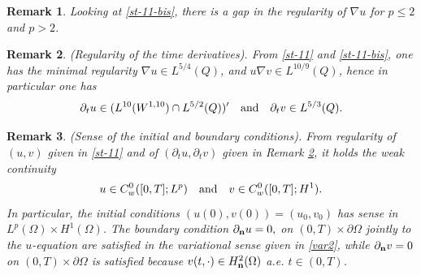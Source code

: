 \documentclass[11pt,reqno]{amsart}%
\newtheorem{remark}{Remark}[section]
\numberwithin{equation}{section}
\begin{document}
%
\begin{remark}
Looking at \eqref{st-11-bis}, there is a gap in the regularity of $\nabla u$ for $p\le 2$ and  $p>2$. 
\end{remark}
%
\begin{remark} \label{re:t-deriv} (Regularity of the time derivatives). 
From \eqref{st-11} and \eqref{st-11-bis}, one has the minimal regularity $\nabla u\in L ^{5/4}(Q)$,  
and $u\nabla v\in L ^{10/9}(Q)$, hence in particular
one has 
$$\partial_t u\in (L^{10}(W^{1,10})\cap L^{5/2}(Q))'
\quad \hbox{and} \quad
\partial_tv\in L^{5/3}(Q).
$$ 
\end{remark}
\begin{remark} (Sense of the initial and boundary conditions).
From regularity of $(u,v)$ given in \eqref{st-11} and of $(\partial_t u, \partial_t v)$ given in Remark \ref{re:t-deriv}, it holds the weak continuity
$$u \in C^0_w([0,T];L^p)\quad \hbox{and}\quad v \in C^0_w([0,T];H^1).
$$
 In particular, the initial conditions $(u(0),v(0))=(u_0,v_0)$ has sense in $L^p(\Omega)\times H^1(\Omega)$.
The boundary condition $\partial_{\bf n} u=0,$ on $(0,T)\times \partial\Omega$ jointly to the $u$-equation are satisfied in the variational sense given in \eqref{var2}, while $\partial_{\bf n} v=0$ on $(0,T)\times \partial\Omega$ is satisfied  because $v(t,\cdot)\in H^2_{\bf n}(\Omega)$ a.e. $t\in (0,T)$.
\end{remark}
\end{document}
